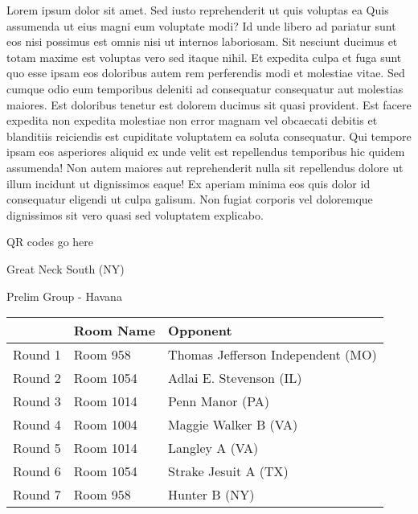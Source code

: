 \documentclass{article}%
\begin{document}
\vspace*{8pt}%
\linebreak%
\newline%
\newline%
Lorem ipsum dolor sit amet. Sed iusto reprehenderit ut quis voluptas ea Quis assumenda ut eius magni eum voluptate modi? Id unde libero ad pariatur sunt eos nisi possimus est omnis nisi ut internos laboriosam. Sit nesciunt ducimus et totam maxime est voluptas vero sed itaque nihil. Et expedita culpa et fuga sunt quo esse ipsam eos doloribus autem rem perferendis modi et molestiae vitae.\newline%
\newline%
Sed cumque odio eum temporibus deleniti ad consequatur consequatur aut molestias maiores. Est doloribus tenetur est dolorem ducimus sit quasi provident. Est facere expedita non expedita molestiae non error magnam vel obcaecati debitis et blanditiis reiciendis est cupiditate voluptatem ea soluta consequatur. Qui tempore ipsam eos asperiores aliquid ex unde velit est repellendus temporibus hic quidem assumenda!\newline%
\newline%
Non autem maiores aut reprehenderit nulla sit repellendus dolore ut illum incidunt ut dignissimos eaque! Ex aperiam minima eos quis dolor id consequatur eligendi ut culpa galisum. Non fugiat corporis vel doloremque dignissimos sit vero quasi sed voluptatem explicabo.\newline%
\newline%
%
\vspace*{30pt}%
\begin{center}%
\begin{Huge}%
QR codes go here%
\end{Huge}%
\end{center}%
\newpage%
%
\begin{center}%
\begin{Huge}%
Great Neck South (NY)%
\end{Huge}%
\vspace*{8pt}%
\linebreak%
\begin{Large}%
Prelim Group {-} Havana%
\end{Large}%
\end{center}%
\begin{tabularx}{\textwidth}{|c|Y|Y|}%
\hline%
&Room Name&Opponent\\%
\hline%
Round 1&Room 958&Thomas Jefferson Independent (MO)\\%
Round 2&Room 1054&Adlai E. Stevenson (IL)\\%
Round 3&Room 1014&Penn Manor (PA)\\%
Round 4&Room 1004&Maggie Walker B (VA)\\%
Round 5&Room 1014&Langley A (VA)\\%
Round 6&Room 1054&Strake Jesuit A (TX)\\%
Round 7&Room 958&Hunter B (NY)\\%
\hline%
\end{tabularx}%
\end{document}
